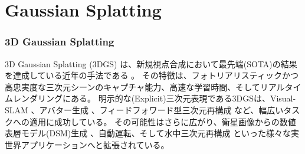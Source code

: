 
\section{Gaussian Splatting}\label{sec:GS}

\subsubsection{3D Gaussian Splatting}\label{sec:3DGS}



3D Gaussian Splatting (3DGS) は、新規視点合成において最先端(SOTA)の結果を達成している近年の手法である \parencite{Kerbl2023ToG_3DGS}。
その特徴は、フォトリアリスティックかつ高忠実度な三次元シーンのキャプチャ能力、高速な学習時間、そしてリアルタイムレンダリングにある。
明示的な(Explicit)三次元表現である3DGSは、Visual-SLAM \parencite{Yan2024CVPR_GS-SLAM,Zheng2025CVPR_WildGS-SLAM,Matsuki2024CVPR_GaussianSplattingSLAM}、アバター生成 \parencite{Moreau2024CVPR_HumanGaussianSplatting,Shao2024CVPR_GaussianAvatar}、フィードフォワード型三次元再構成 \parencite{Chen2024ECCV_MVSplatting} など、幅広いタスクへの適用に成功している。
その可能性はさらに広がり、衛星画像からの数値表層モデル(DSM)生成 \parencite{Aira2025CVPR_EOGS}、自動運転、そして水中三次元再構成 \parencite{li20243DV_watersplatting} といった様々な実世界アプリケーションへと拡張されている。


